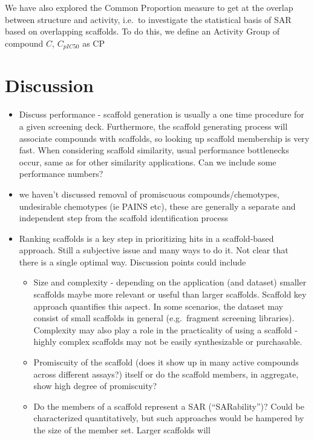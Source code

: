 \documentclass[journal=jacsat,manuscript=article]{achemso}
\newcommand*\eg{e.g.~}
\newcommand*\ie{i.e.~}
\begin{document}
We have also explored the Common Proportion measure to get at the overlap between structure and activity, \ie to investigate the statistical basis of SAR based on overlapping scaffolds. To do this, we define an Activity Group of compound $C$, $C_{pIC50}$ as CP    

\section{Discussion}
\label{sec:discussion}

\begin{itemize}
\item Discuss performance - scaffold generation is usually a one time procedure
  for a given screening deck. Furthermore, the scaffold generating process will
  associate compounds with scaffolds, so looking up scaffold membership is very
  fast. When considering scaffold similarity, usual performance bottlenecks
  occur, same as for other similarity applications. Can we include some
  performance numbers?
\item we haven't discussed removal of promiscuous compounds/chemotypes,
  undesirable chemotypes (ie PAINS etc), these are generally a separate and
  independent step from the scaffold identification process
\item Ranking scaffolds is a key step in prioritizing hits in a scaffold-based
  approach. Still a subjective issue and many ways to do it. Not clear that
  there is a single optimal way. Discussion points could include
  \begin{itemize}
  \item Size and complexity - depending on the application (and
    dataset) smaller scaffolds maybe more relevant or useful than
    larger scaffolds. Scaffold key approach \cite{Ertl:2014eu}
    quantifies this aspect. In some scenarios, the dataset may consist
    of small scaffolds in general (\eg fragment screening
    libraries). Complexity may also play a role in the practicality of
    using a scaffold - highly complex scaffolds may not be easily
    synthesizable or purchasable.
  \item Promiscuity of the scaffold (does it show up in many active
    compounds across different assays?) itself or do the scaffold
    members, in aggregate, show high degree of promiscuity?
  \item Do the members of a scaffold represent a SAR (``SARability'')?
    Could be characterized quantitatively, but such approaches would
    be hampered by the size of the member set. Larger scaffolds will

\end{itemize}
\end{itemize}
\end{document}
